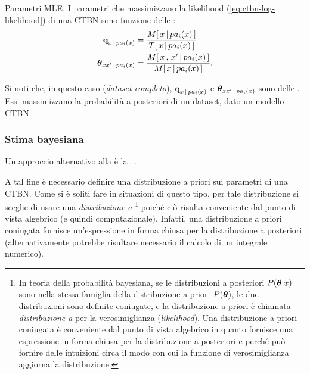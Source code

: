 \begin{teorema}{Parametri \ac{MLE}.}
    I parametri che massimizzano la likelihood (\autoref{eq:ctbn-log-likelihood}) di una \acl{CTBN} sono funzione delle \keyword{\stats{}}:
    \begin{equation}
        \label{eq:ctbn-params}
        \normalfont
        \begin{split}
        \param{q}_{\setel{x}\,\arrowvert\,pa_i(\setel{x})}&=\frac{\mstat{x\,\arrowvert\,pa_i(\setel{x})}}{\tstat{\setel{x}\,\arrowvert\,pa_i(\setel{x})}} \\
        \param{$\theta$}_{\setel{x}\setel{x}^\prime\,\arrowvert\,pa_i(\setel{x})}&=\frac{\mstat[x]{\setel{x}^\prime\,\arrowvert\,pa_i(\setel{x})}}{\mstat{\setel{x}\,\arrowvert\,pa_i(\setel{x})}}\text{.}
        \end{split}
        \end{equation}
\end{teorema}
\normalfont
Si noti che, in questo caso (\emph{dataset completo}), $\boldsymbol{\textbf{\text{q}}}_{\mathnormal{x}\,\arrowvert\,pa_i(\mathnormal{x})}$ e $\boldsymbol{\textbf{\text{$\theta$}}}_{\mathnormal{x}\mathnormal{x}^\prime\,\arrowvert\,pa_i(\mathnormal{x})}$ sono delle \emph{}. Essi massimizzano la probabilità a posteriori di un dataset, dato un modello \acs{CTBN}.

\subsubsection{Stima bayesiana}
\label{subsec:ctbn-bayesian-estimate}
Un approccio alternativo alla  è la ~\citep[si veda][sottosezione 5.1.1]{Nodelman2007}.

A tal fine è necessario definire una distribuzione a priori sui parametri di una \acs{CTBN}. Come si è soliti fare in situazioni di questo tipo, per tale distribuzione si sceglie di usare una \emph{distribuzione a }\footnote{\label{note:conjugate-prior}In teoria della probabilità bayesiana, se le distribuzioni a posteriori $P(\boldsymbol{\textbf{\text{$\theta$}}}|\mathnormal{x})$ sono nella stessa famiglia della distribuzione a priori $P(\boldsymbol{\textbf{\text{$\theta$}}})$, le due distribuzioni sono definite coniugate, e la distribuzione a priori è chiamata \emph{distribuzione a } per la verosimiglianza (\emph{likelihood}). Una distribuzione a priori coniugata è conveniente dal punto di vista algebrico in quanto fornisce una espressione in forma chiusa per la distribuzione a posteriori e perché può fornire delle intuizioni circa il modo con cui la funzione di verosimiglianza aggiorna la distribuzione.} poiché ciò risulta conveniente dal punto di vista algebrico (e quindi computazionale). Infatti, una distribuzione a priori coniugata fornisce un'espressione in forma chiusa per la distribuzione a posteriori (alternativamente potrebbe risultare necessario il calcolo di un integrale numerico).

